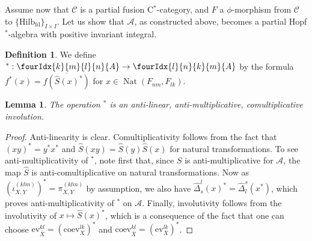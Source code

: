\documentclass[10pt]{article}
\DeclareMathOperator{\fin}{\mathrm{fd}}
\DeclareMathOperator{\Nat}{\mathrm{Nat}}
\newcommand{\CatCC}{\mathscr{C}}
\newcommand{\Hilb}{\mathrm{Hilb}}
\newcommand{\ev}{\mathrm{ev}}
\newcommand{\coev}{\mathrm{coev}}
\newcommand{\Gr}[5]{\fourIdx{#2}{#4}{#3}{#5}{#1}}%
\newtheorem{Lem}[Theorem]{Lemma}
\theoremstyle{definition}
\newtheorem{Def}[Theorem]{Definition}
\numberwithin{equation}{section}
\begin{document}
Assume now that $\CatCC$ is a partial fusion C$^*$-category, and $F$ a $\phi$-morphism from $\CatCC$ to $\{\Hilb_{\fin}\}_{I\times I}$. Let us show that $\mathscr{A}$, as constructed above, becomes a partial Hopf $^*$-algebra with positive invariant integral.

\begin{Def} We define $^*: \Gr{A}{k}{l}{m}{n}\rightarrow \Gr{A}{l}{k}{n}{m}$ by the formula $f^*(x) = \overline{f(\hat{S}(x)^*)}$ for $x\in \Nat(F_{nm},F_{lk}).$
\end{Def}

\begin{Lem} The operation $^*$ is an anti-linear, anti-multiplicative, comultiplicative involution.
\end{Lem}

\begin{proof} Anti-linearity is clear. Comultiplicativity follows from
  the fact that $(xy)^* = y^*x^*$ and $\hat{S}(xy) =
  \hat{S}(y)\hat{S}(x)$ for natural transformations. To see
  anti-multiplicativity of $^*$, note first that, since $S$ is
  anti-multiplicative for $\mathscr{A}$, the map $\hat{S}$ is anti-comultiplicative on natural transformations. Now as $(\iota_{X,Y}^{(klm)})^* = \pi_{X,Y}^{(klm)}$ by assumption, we also have $\hat{\Delta}^l_s(x)^* = \hat{\Delta}^s_l(x^*)$, which proves anti-multiplicativity of $^*$ on $\mathscr{A}$.  Finally, involutivity follows from the involutivity of $x\mapsto \hat{S}(x)^*$, which is a consequence of the fact that one can choose $\ev_{\bar{X}}^{kl} = (\coev_{X}^{lk})^*$ and $\coev_{\bar{X}}^{kl} = (\ev_X^{lk})^*$.
\end{proof}
\end{document}
